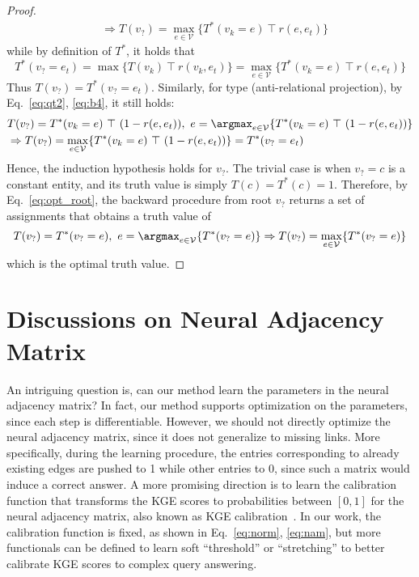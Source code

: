 \begin{proof}
\begin{equation}
\begin{aligned}
        &\Rightarrow T(v_?) = \max_{e\in\mathcal{V}}\{T^*(v_k=e)\ \top\ r(e, e_t)\}
    \end{aligned}
    \end{equation}
    while by definition of $T^*$, it holds that
    \begin{equation}
        T^*(v_?=e_t) = \max\{T(v_k)\ \top\ r(v_k, e_t)\}
        = \max_{e\in\mathcal{V}}\{T^*(v_k=e)\ \top\ r(e, e_t)\}
    \end{equation}
    Thus $T(v_?)=T^*(v_?=e_t)$. Similarly, for type  (anti-relational projection), by Eq.~\ref{eq:qt2}, \ref{eq:b4}, it still holds:
    \begin{equation}
    \begin{aligned}
        &T(v_?) = T^*(v_k=e)\ \top\ (1-r(e, e_t)),\ e=\argmax_{e\in\mathcal{V}}\{T^{*}(v_k=e)\ \top\ (1-r(e, e_t))\} \\
        &\Rightarrow T(v_?) = \max_{e\in\mathcal{V}}\{T^*(v_k=e)\ \top\ (1-r(e, e_t))\}=T^*(v_?=e_t)
    \end{aligned}
    \end{equation}
    Hence, the induction hypothesis holds for $v_?$.
    The trivial case is when $v_?=c$ is a constant entity, and its truth value is simply $T(c)=T^*(c)=1$.
    Therefore, by Eq.~\ref{eq:opt_root}, the backward procedure from root $v_?$ returns a set of assignments that obtains a truth value of 
    \begin{equation}
        T(v_?)=T^*(v_?=e),\ e=\argmax_{e\in\mathcal{V}}\{T^*(v_?=e)\}
        \Rightarrow T(v_?)=\max_{e\in\mathcal{V}}\{T^*(v_?=e)\}
    \end{equation}
    which is the optimal truth value.
\end{proof}

\section{Discussions on Neural Adjacency Matrix}
\label{app:discussion}
An intriguing question is, can our method learn the parameters in the neural adjacency matrix?
In fact, our method supports optimization on the parameters, since each step is differentiable.
However, we should not directly optimize the neural adjacency matrix, since it does not generalize to missing links.
More specifically, during the learning procedure, the entries corresponding to already existing edges are pushed to 1 while other entries to 0, since such a matrix would induce a correct answer.
A more promising direction is to learn the calibration function that transforms the KGE scores to probabilities between $[0, 1]$ for the neural adjacency matrix, also known as KGE calibration~\cite{safavi2020evaluating}.
In our work, the calibration function is fixed, as shown in Eq.~\ref{eq:norm}, \ref{eq:nam}, but more functionals can be defined to learn soft ``threshold'' or ``stretching'' to better calibrate KGE scores to complex query answering.

